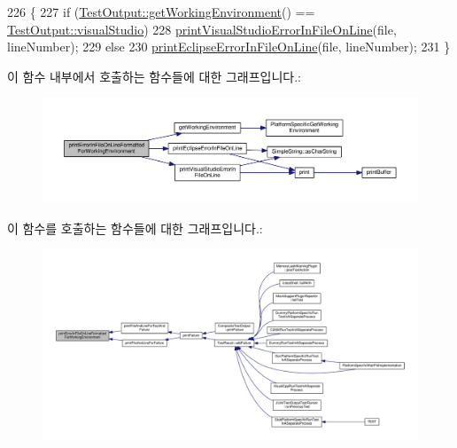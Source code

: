 \begin{DoxyCode}
226 \{
227     \textcolor{keywordflow}{if} (\hyperlink{class_test_output_a90d5028d0f7f6f41ca2dced042a8709d}{TestOutput::getWorkingEnvironment}() == 
      \hyperlink{class_test_output_a0541851f863713454486a9fb3080f766a47f3a5b9ed4237588024b983a4ca8399}{TestOutput::visualStudio})
228         \hyperlink{class_test_output_a0a0136e850e6b9a696ab84e5c416341a}{printVisualStudioErrorInFileOnLine}(file, lineNumber);
229     \textcolor{keywordflow}{else}
230         \hyperlink{class_test_output_aa2b6f28b76a53cac4059991bc3c86f79}{printEclipseErrorInFileOnLine}(file, lineNumber);
231 \}
\end{DoxyCode}


이 함수 내부에서 호출하는 함수들에 대한 그래프입니다.\+:
\nopagebreak
\begin{figure}[H]
\begin{center}
\leavevmode
\includegraphics[width=350pt]{class_test_output_a56ae5964123fc91c7149a8274aa22db9_cgraph}
\end{center}
\end{figure}




이 함수를 호출하는 함수들에 대한 그래프입니다.\+:
\nopagebreak
\begin{figure}[H]
\begin{center}
\leavevmode
\includegraphics[width=350pt]{class_test_output_a56ae5964123fc91c7149a8274aa22db9_icgraph}
\end{center}
\end{figure}


